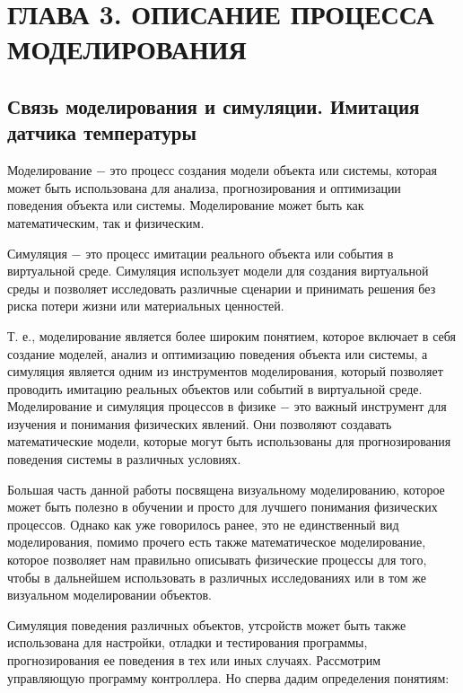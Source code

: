\chapter{ГЛАВА 3. ОПИСАНИЕ ПРОЦЕССА МОДЕЛИРОВАНИЯ}
\label{ch:chapter3}
\section{Связь моделирования и симуляции. Имитация датчика температуры}

Моделирование $-$ это процесс создания модели объекта или системы, которая может быть использована для анализа, прогнозирования и оптимизации поведения объекта или системы. Моделирование может быть как математическим, так и физическим.

Симуляция $-$ это процесс имитации реального объекта или события в виртуальной среде. Симуляция использует модели для создания виртуальной среды и позволяет исследовать различные сценарии и принимать решения без риска потери жизни или материальных ценностей.

Т. е., моделирование является более широким понятием, которое включает в себя создание моделей, анализ и оптимизацию поведения объекта или системы, а симуляция является одним из инструментов моделирования, который позволяет проводить имитацию реальных объектов или событий в виртуальной среде. Моделирование и симуляция процессов в физике $-$ это важный инструмент для изучения и понимания физических явлений. Они позволяют создавать математические модели, которые могут быть использованы для прогнозирования поведения системы в различных условиях.

Большая часть данной работы посвящена визуальному моделированию, которое может быть полезно в обучении и просто для лучшего понимания физических процессов. Однако как уже говорилось ранее, это не единственный вид моделирования, помимо прочего есть также математическое моделирование, которое позволяет нам правильно описывать физические процессы для того, чтобы  в дальнейшем использовать в различных исследованиях или в том же визуальном моделировании объектов.

Симуляция поведения различных объектов, утсройств может быть также использована для настройки, отладки и тестирования программы, прогнозирования ее поведения в тех или иных случаях. Рассмотрим управляющую программу контроллера. Но сперва дадим определения понятиям:

